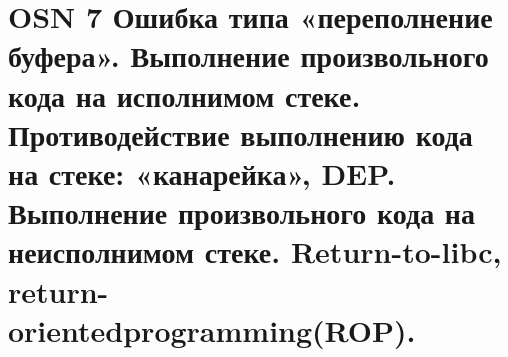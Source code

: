 \section*{OSN 7 Ошибка типа «переполнение буфера». Выполнение произвольного кода на исполнимом стеке. Противодействие выполнению кода на стеке: «канарейка»,
DEP. Выполнение произвольного кода на неисполнимом стеке. Return-to-libc, return-orientedprogramming(ROP).}
